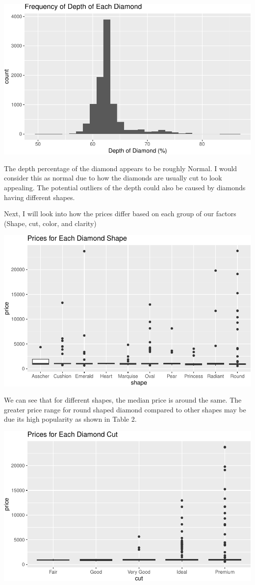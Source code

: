 \documentclass[
]{article}
\begin{document}
\begin{center}\includegraphics[width=0.8\linewidth]{Methods_and_Results_files/figure-latex/unnamed-chunk-7-1} \end{center}

The depth percentage of the diamond appears to be roughly Normal. I
would consider this as normal due to how the diamonds are usually cut to
look appealing. The potential outliers of the depth could also be caused
by diamonds having different shapes.

Next, I will look into how the prices differ based on each group of our
factors (Shape, cut, color, and clarity)

\begin{center}\includegraphics[width=0.8\linewidth]{Methods_and_Results_files/figure-latex/unnamed-chunk-8-1} \end{center}

We can see that for different shapes, the median price is around the
same. The greater price range for round shaped diamond compared to other
shapes may be due its high popularity as shown in Table 2.

\begin{center}\includegraphics[width=0.8\linewidth]{Methods_and_Results_files/figure-latex/unnamed-chunk-9-1} \end{center}
\end{document}
